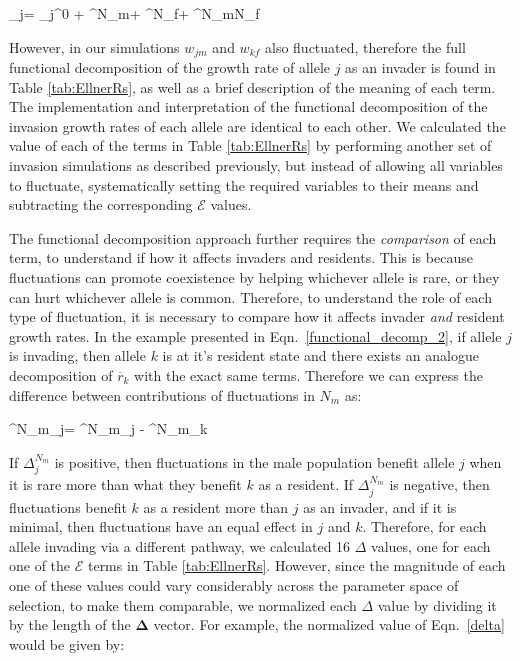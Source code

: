 \documentclass[12pt]{article}
\let\oldequation\equation
\let\oldendequation\endequation
\renewenvironment{equation}
  {\linenomathNonumbers\oldequation}
  {\oldendequation\endlinenomath}
\begin{document}
\begin{equation}
    _{j}= _{j}^{0} + ^{N_{m}}+ ^{N_{f}}+ ^{N_{m}N_{f}}
   \label{functional_decomp_2}
\end{equation}

 However, in our simulations $w_{jm}$ and $w_{kf}$ also fluctuated, therefore the full functional decomposition of the growth rate of allele $j$ as an invader is found in Table \ref{tab:EllnerRs}, as well as a brief description of the meaning of each term. The implementation and interpretation of the functional decomposition of the invasion growth rates of each allele are identical to each other. We calculated the value of each of the terms in Table \ref{tab:EllnerRs} by performing another set of invasion simulations as described previously, but instead of allowing all variables to fluctuate, systematically setting the required variables to their means and subtracting the corresponding $\mathcal{E}$ values.


The functional decomposition approach further requires the \textit{comparison} of each term, to understand if how it affects invaders and residents. This is because fluctuations can promote coexistence by helping whichever allele is rare, or they can hurt whichever allele is common. Therefore, to understand the role of each type of fluctuation, it is necessary to compare how it affects invader \textit{and} resident growth rates. In the example presented in Eqn.~\ref{functional_decomp_2}, if allele $j$ is invading, then allele $k$ is at it's resident state and there exists an analogue decomposition of $\overline{r}_{k}$ with the exact same terms. Therefore we can express the difference between contributions of fluctuations in $N_{m}$ as:


\begin{equation}
\Delta^{N_{m}}_{j}= ^{N_{m}}_{j} - ^{N_{m}}_{k}
\label{delta}
\end{equation}

If $\Delta^{N_{m}}_{j}$ is positive, then fluctuations in the male population benefit allele $j$ when it is rare more than what they benefit $k$ as a resident. If $\Delta^{N_{m}}_{j}$ is negative, then fluctuations benefit $k$ as a resident more than $j$ as an invader, and if it is minimal, then fluctuations have an equal effect in $j$ and $k$. Therefore, for each allele invading via a different pathway, we calculated 16 $\Delta$ values, one for each one of the $\mathcal{E}$ terms in Table \ref{tab:EllnerRs}. However, since the magnitude of each one of these values could vary considerably across the parameter space of selection, to make them comparable, we normalized each $\Delta$ value by dividing it by the length of the $\boldsymbol{\Delta}$ vector. For example, the normalized value of Eqn.~\ref{delta} would be given by:
\end{document}
